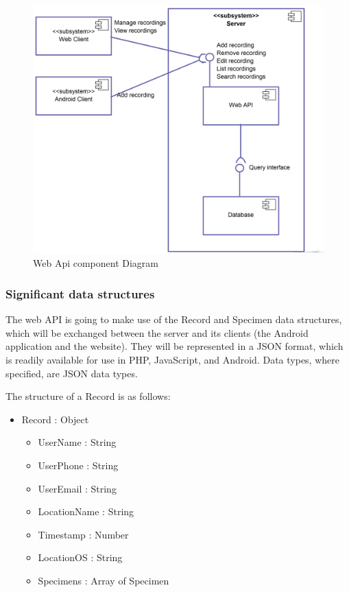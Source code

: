         \begin{landscape}
            \begin{figure}
                \centering
                \includegraphics[scale=0.2]{server/ComponentDiagram.png}
                \caption{Web Api component Diagram}
                \label{fig:webAPIComponentDiagram}
            \end{figure}
        \end{landscape}

    \subsubsection{Significant data structures}

        The web API is going to make use of the Record and Specimen data structures, which will be exchanged between the server and its clients (the Android application and the website). They will be represented in a JSON format, which is readily available for use in PHP, JavaScript, and Android. Data types, where specified, are JSON data types. 

        The structure of a Record is as follows:
        \begin{itemize}
            \item Record : Object
            \begin{itemize}
                \item UserName : String
                \item UserPhone : String
                \item UserEmail : String
                \item LocationName : String 
                \item Timestamp : Number 
                \item LocationOS : String
                \item Specimens : Array of Specimen
            \end{itemize}
        \end{itemize}

